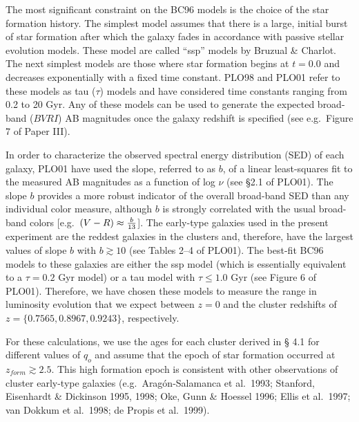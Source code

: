 \documentclass[preprint]{aastex}
\begin{document}
The most significant constraint on the BC96 models is the choice of
the star formation history.  The simplest model assumes that there is
a large, initial burst of star formation after which the galaxy fades
in accordance with passive stellar evolution models.  These model are
called ``ssp'' models by Bruzual \& Charlot.  The next simplest models
are those where star formation begins at $t=0.0$ and decreases
exponentially with a fixed time constant.  PLO98 and PLO01 refer to
these models as tau ($\tau$) models and have considered time constants
ranging from 0.2 to 20 Gyr. Any of these models can be used to
generate the expected broad-band ($BVRI$) AB magnitudes once the
galaxy redshift is specified (see e.g.\ Figure 7 of Paper III).

In order to characterize the observed spectral energy distribution
(SED) of each galaxy, PLO01 have used the slope, referred to as $b$,
of a linear least-squares fit to the measured AB magnitudes as a
function of log $\nu$ (see \S 2.1 of PLO01). The slope $b$ provides a
more robust indicator of the overall broad-band SED than any
individual color measure, although $b$ is strongly correlated with the
usual broad-band colors [e.g.\ $(V-R) \approx {b\over{13}}$]. The
early-type galaxies used in the present experiment are the reddest
galaxies in the clusters and, therefore, have the largest values of
slope $b$ with $b \gtrsim 10$ (see Tables 2--4 of PLO01). The best-fit
BC96 models to these galaxies are either the ssp model (which is
essentially equivalent to a $\tau = 0.2$ Gyr model) or a tau model
with $\tau \le 1.0$ Gyr (see Figure 6 of PLO01).  Therefore, we have
chosen these models to measure the range in luminosity evolution that
we expect between $z = 0$ and the cluster redshifts of $z = \{0.7565,
0.8967, 0.9243\}$, respectively.

For these calculations, we use the ages for each cluster derived in \S
4.1 for different values of $q_o$ and assume that the epoch of star
formation occurred at $z_{form} \gtrsim 2.5$.  This high formation
epoch is consistent with other observations of cluster early-type
galaxies (e.g.\ Arag\'on-Salamanca et al.\ 1993; Stanford, Eisenhardt
\& Dickinson 1995, 1998; Oke, Gunn \& Hoessel 1996; Ellis et al.\
1997; van Dokkum et al.\ 1998; de Propis et al.\ 1999).
\end{document}
